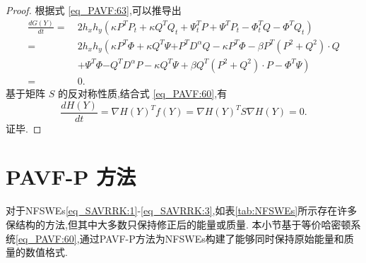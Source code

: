 \begin{proof}
	根据式 \eqref{eq_PAVF:63},可以推导出
	\begin{align}\label{eq_PAVF:64}
		\frac{d G(Y)}{d t}=&~2 h_{x} h_{y}\left(\kappa P^{T}P_t+\kappa Q^{T}Q_t+\Psi^{T}_t P+\Psi^{T}P_{t}-\varPhi^{T}_t Q-\varPhi^{T}Q_{t}\right)\nonumber\\
		=&~2 h_{x} h_{y}\left(\kappa P^{T}\varPhi+\kappa Q^{T}\Psi {+ P^{T}D^{\alpha}Q}-\kappa P^{T}\varPhi-\beta P^{T}\left( P^{2}+Q^{2}\right)\cdot Q\right.\nonumber\\
		&~\left.+\Psi^{T}\varPhi{-Q^{T}D^{\alpha}P}-\kappa Q^{T}\Psi+\beta Q^{T}\left( P^{2}+Q^{2}\right)\cdot P-\varPhi^{T}\Psi\right)\nonumber\\
		=&~0.
		\end{align}
		基于矩阵 $S$ 的反对称性质,结合式 \eqref{eq_PAVF:60},有
		\begin{equation}\label{eq_PAVF:65}
		\frac{d H(Y)}{d t}=\nabla H(Y)^{T} f(Y)=\nabla H(Y)^{T} S \nabla H(Y)=0 .
		\end{equation}
		证毕.
		\end{proof}

\section{PAVF-P 方法}\label{Section_PAVF: 3}
对于NFSWEs\eqref{eq_SAVRRK:1}-\eqref{eq_SAVRRK:3},如表\ref{tab:NFSWEs}所示存在许多保结构的方法,但其中大多数只保持修正后的能量或质量.
本小节基于等价哈密顿系统\eqref{eq_PAVF:60},通过PAVF-P方法\cite{caiPartitionedAveragedVector2018}为NFSWEs构建了能够同时保持原始能量和质量的数值格式.

